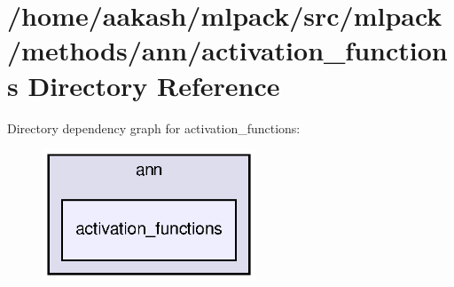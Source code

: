 \section{/home/aakash/mlpack/src/mlpack/methods/ann/activation\+\_\+functions Directory Reference}
\label{dir_a05b89e13e21ccb1d653eec334a23617}
Directory dependency graph for activation\+\_\+functions\+:
\nopagebreak
\begin{figure}[H]
\begin{center}
\leavevmode
\includegraphics[width=180pt]{dir_a05b89e13e21ccb1d653eec334a23617_dep}
\end{center}
\end{figure}
